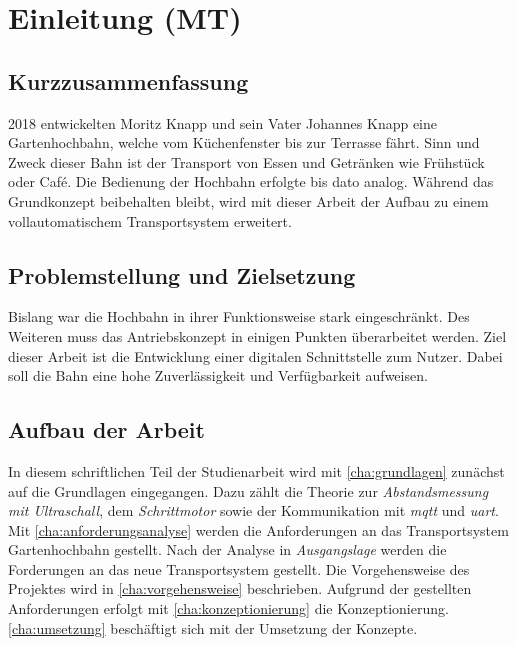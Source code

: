 
\chapter{Einleitung (MT)}

\section{Kurzzusammenfassung}
2018 entwickelten Moritz Knapp und sein Vater Johannes Knapp eine Gartenhochbahn, welche vom Küchenfenster bis zur Terrasse fährt. 
Sinn und Zweck dieser Bahn ist der Transport von Essen und Getränken wie Frühstück oder Café. Die Bedienung der Hochbahn erfolgte bis dato analog. Während das Grundkonzept beibehalten bleibt, wird mit dieser Arbeit der Aufbau zu einem vollautomatischem Transportsystem erweitert.

\section{Problemstellung und Zielsetzung}
    
Bislang war die Hochbahn in ihrer Funktionsweise stark eingeschränkt. Des Weiteren muss das Antriebskonzept in einigen Punkten überarbeitet werden. Ziel dieser Arbeit ist die Entwicklung einer digitalen Schnittstelle zum Nutzer. Dabei soll die Bahn eine hohe Zuverlässigkeit und Verfügbarkeit aufweisen. 
\newpage

\section{Aufbau der Arbeit}
In diesem schriftlichen Teil der Studienarbeit wird mit \autoref{cha:grundlagen} zunächst auf die Grundlagen eingegangen. Dazu zählt die Theorie zur \textit{Abstandsmessung mit Ultraschall}, dem \textit{Schrittmotor} sowie der Kommunikation mit \textit{\acrshort{mqtt}} und \textit{\acrshort{uart}}. 
Mit \autoref{cha:anforderungsanalyse} werden die Anforderungen an das Transportsystem Gartenhochbahn gestellt. Nach der Analyse in \textit{Ausgangslage} werden die Forderungen an das neue Transportsystem gestellt. Die Vorgehensweise des Projektes wird in \autoref{cha:vorgehensweise} beschrieben. Aufgrund der gestellten Anforderungen erfolgt mit \autoref{cha:konzeptionierung} die Konzeptionierung. \autoref{cha:umsetzung} beschäftigt sich mit der Umsetzung der Konzepte. 
 




